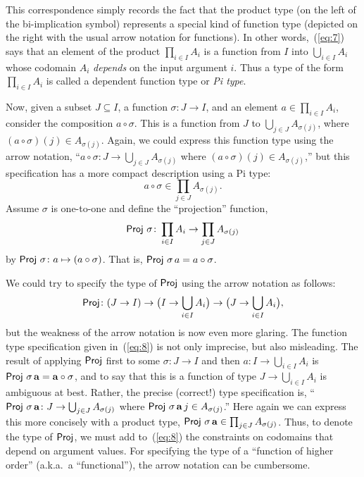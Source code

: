 \documentclass[11pt]{amsart}  %
\begin{document}
This correspondence simply records the fact that the product type 
(on the left of the bi-implication symbol) represents a special 
kind of function type (depicted on the right with the usual 
arrow notation for functions). In other words,~(\ref{eq:7}) says that
an element of the product $\prod_{i\in I} A_i$
is a function from $I$ into $\bigcup_{i\in I} A_i$ 
whose codomain $A_i$ \emph{depends} on the input argument $i$.  
Thus a type of the form $\prod_{i\in I} A_i$ is called a dependent function type or \emph{Pi type}.

Now, given a subset $J \subseteq I$, a function
$\sigma\colon J \rightarrow I$, and an element $a \in \prod_{i\in I}A_i$,
consider the composition $a \circ \sigma$.  This is a function from $J$ 
to $\bigcup_{j\in J} A_{\sigma(j)}$, where $(a\circ \sigma)(j) \in A_{\sigma(j)}$.
Again, we could express this function type using the arrow notation,
``$a \circ \sigma\colon J \rightarrow \bigcup_{j\in J} A_{\sigma(j)}$ 
where $(a\circ \sigma)(j) \in A_{\sigma(j)}$,'' but this 
specification has a more compact description using a Pi type:
\[
a \circ \sigma \in \prod_{j\in J} A_{\sigma(j)}.
\]
Assume $\sigma$ is one-to-one and define the ``projection'' function,
\[
\operatorname{\mathsf{Proj}} \, \sigma  \colon \prod_{i\in I} A_{i} \rightarrow \prod_{j\in J} A_{\sigma(j)}
\]
by 
$\operatorname{\mathsf{Proj}} \, \sigma \colon a \mapsto (a \circ \sigma)$.  That is,
$\operatorname{\mathsf{Proj}} \, \sigma \, a = a \circ \sigma$. 

We could try to specify the type of $\operatorname{\mathsf{Proj}}$ using the arrow notation 
as follows:
\begin{equation}
  \label{eq:8}
  \operatorname{\mathsf{Proj}} \colon (J \rightarrow I)\rightarrow 
  \bigl(I \rightarrow \bigcup_{i\in I} A_{i}\bigr) \rightarrow 
  \bigl(J \rightarrow \bigcup_{i\in I} A_{i}\bigr),
\end{equation}
but the weakness of the arrow notation is now even more glaring.
The function type specification given in~(\ref{eq:8}) 
is not only imprecise, but also misleading. The result of
applying $\operatorname{\mathsf{Proj}}$ first to some $\sigma \colon J \rightarrow I$ and  then
$a\colon I \rightarrow \bigcup_{i\in I} A_{i}$ is 
$\operatorname{\mathsf{Proj}} \, \sigma \, \mathbf{a}= \mathbf{a} \circ \sigma$, and to say that this is 
a function of type $J \rightarrow \bigcup_{i\in I} A_{i}$ 
is ambiguous at best. Rather, the precise (correct!) type
specification is,
``$\operatorname{\mathsf{Proj}} \, \sigma \, \mathbf{a} \colon J \rightarrow \bigcup_{j\in J} A_{\sigma(j)}$ where 
$\operatorname{\mathsf{Proj}}\, \sigma \, \mathbf{a} \, j \in A_{\sigma(j)}$.'' Here again we can express this 
more concisely with a product type,
$\operatorname{\mathsf{Proj}} \, \sigma \, \mathbf{a} \in \prod_{j\in J} A_{\sigma(j)}$.
Thus, to denote the type of $\operatorname{\mathsf{Proj}}$, we must add to~(\ref{eq:8}) 
the constraints on codomains that depend on argument values. 
For specifying the type of a ``function of higher order'' 
(a.k.a.~a ``functional''), the arrow notation can be cumbersome. 
\end{document}
